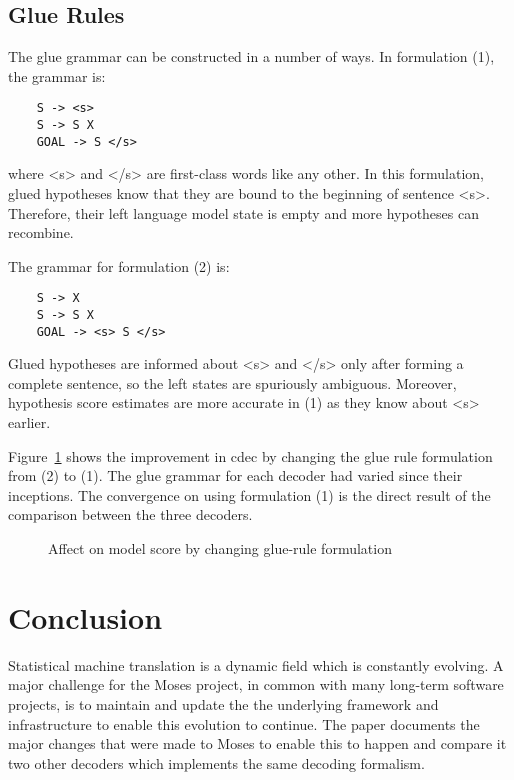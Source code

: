 \documentclass{pbml}
\begin{document}
\subsection{Glue Rules}

The glue grammar can be constructed in a number of ways. In formulation (1), the grammar is:
\begin{verbatim}
    S -> <s>
    S -> S X
    GOAL -> S </s> 
\end{verbatim}
 where <s> and </s> are first-class words like any other. In this formulation, glued hypotheses know that they are bound to the beginning of sentence <s>.  Therefore, their left language model state is empty and more hypotheses can recombine.  
 
The grammar for formulation (2) is:
\begin{verbatim}
    S -> X
    S -> S X
    GOAL -> <s> S </s> 
\end{verbatim}
Glued hypotheses are informed about <s> and </s> only after forming a complete sentence, so the left states are spuriously ambiguous.  Moreover, hypothesis score estimates are more accurate in (1) as they know about <s> earlier. 

Figure~\ref{fig:glue} shows the improvement in cdec by changing the glue rule formulation from (2) to (1). The glue grammar for each decoder had varied since their inceptions. The convergence on using formulation (1) is the direct result of the comparison between the three decoders.

 \begin{figure}[h]
 \begin{center}
 
 \end{center}
 \caption{Affect on model score by changing glue-rule formulation}
 \label{fig:glue}
 \end{figure}


\section{Conclusion}

Statistical machine translation is a dynamic field which is constantly evolving. A major challenge for the Moses project, in common with many long-term software projects, is to maintain and update the the underlying framework and infrastructure to enable this evolution to continue. The paper documents the major changes that were made to Moses to enable this to happen and compare it two other decoders which implements the same decoding formalism.
\end{document}
